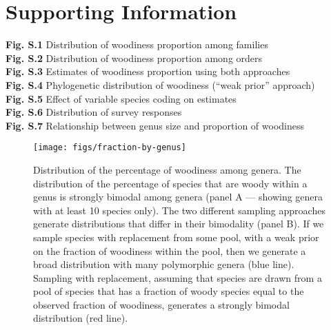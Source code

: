\documentclass[a4paper,12pt]{article}
\begin{document}
\section{Supporting Information}

\begin{flushleft}
\textbf{Fig. S.1} Distribution of woodiness proportion among families\\
\textbf{Fig. S.2} Distribution of woodiness proportion among orders\\
\textbf{Fig. S.3} Estimates of woodiness proportion using both approaches\\
\textbf{Fig. S.4} Phylogenetic distribution of woodiness (``weak prior'' approach)\\
\textbf{Fig. S.5} Effect of variable species coding on estimates\\
\textbf{Fig. S.6} Distribution of survey responses\\
\textbf{Fig. S.7} Relationship between genus size and proportion of woodiness
\end{flushleft}

\begin{figure}[p]
  \centering
  \texttt{[image: figs/fraction-by-genus]}
  \caption{Distribution of the percentage of woodiness among genera.
    The distribution of the percentage of species that are woody within
    a genus is strongly bimodal among genera (panel A --- showing
    genera with at least 10 species only).
    The two different sampling approaches generate distributions that
    differ in their bimodality (panel B). If we sample species
    with replacement from some pool, with a weak prior on
    the fraction of woodiness within the pool, then we generate a broad
    distribution with many polymorphic genera (blue line).
    Sampling with replacement, assuming that species are drawn from a
    pool of species that has a fraction of woody species equal to the
    observed fraction of woodiness, generates a strongly bimodal
    distribution (red line).}
  \label{fig:distribution-genera}
\end{figure}
\end{document}
